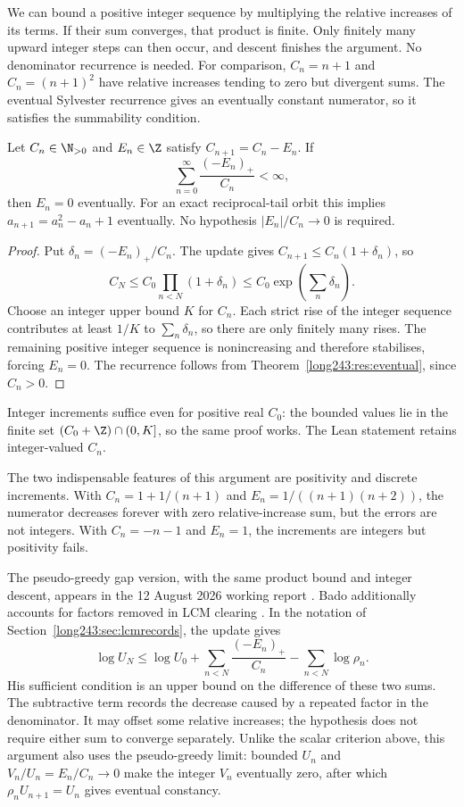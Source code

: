 We can bound a positive integer sequence by multiplying the relative
increases of its terms. If their sum converges, that product is finite.
Only finitely many upward integer steps can then occur, and descent
finishes the argument. No denominator recurrence is needed.
For comparison, $C_n=n+1$ and $C_n=(n+1)^2$ have relative increases
tending to zero but divergent sums. The eventual Sylvester recurrence gives an eventually
constant numerator, so it satisfies the summability condition.

\begin{samepage}
\begin{theorem}\label{long243:res:mass}
Let \(C_n\in\N_{>0}\) and \(E_n\in\Z\) satisfy \(C_{n+1}=C_n-E_n\).
If
\[
 \sum_{n=0}^{\infty}\frac{(-E_n)_+}{C_n}<\infty,
\]
then \(E_n=0\) eventually. For an exact reciprocal-tail orbit this implies
\(a_{n+1}=a_n^2-a_n+1\) eventually. No hypothesis $|E_n|/C_n\to0$ is required.
\end{theorem}
\end{samepage}

\begin{proof}
Put \(\delta_n=(-E_n)_+/C_n\). The update gives
\(C_{n+1}\le C_n(1+\delta_n)\), so
\[
 C_N\le C_0\prod_{n<N}(1+\delta_n)
 \le C_0\exp\!\left(\sum_n\delta_n\right).
\]
Choose an integer upper bound \(K\) for \(C_n\). Each strict rise of the
integer sequence contributes at least \(1/K\) to \(\sum_n\delta_n\), so
there are only finitely many rises. The remaining positive integer sequence
is nonincreasing and therefore stabilises, forcing \(E_n=0\). The recurrence
follows from Theorem~\ref{long243:res:eventual}, since \(C_n>0\).
\end{proof}

Integer increments suffice even for positive real $C_0$: the bounded
values lie in the finite set $(C_0+\Z)\cap(0,K]$, so the same proof
works. The Lean statement retains integer-valued $C_n$.

The two indispensable features of this argument are positivity and
discrete increments. With $C_n=1+1/(n+1)$ and
$E_n=1/((n+1)(n+2))$, the numerator decreases forever with zero
relative-increase sum, but the errors are not integers. With $C_n=-n-1$
and $E_n=1$, the increments are integers but positivity fails.

The pseudo-greedy gap version, with the same product bound and integer
descent, appears in the 12 August 2026 working report
\cite[``A global termination criterion'']{erdosproblemaday243}.
Bado additionally accounts for factors removed in LCM clearing
\cite[Thm.~11.1 and Remark~11.3, p.~9]{bado2026}. In the notation of
Section~\ref{long243:sec:lcmrecords}, the update gives
\[
 \log U_N\le\log U_0+
 \sum_{n<N}\frac{(-E_n)_+}{C_n}-\sum_{n<N}\log\rho_n.
\]
His sufficient condition is an upper bound on the difference of these
two sums. The subtractive term records the decrease caused by a repeated
factor in the denominator. It may offset some relative increases; the
hypothesis does not require either sum to converge separately. Unlike the
scalar criterion above, this argument also uses the pseudo-greedy limit:
bounded $U_n$ and $V_n/U_n=E_n/C_n\to0$ make the integer $V_n$ eventually
zero, after which $\rho_nU_{n+1}=U_n$ gives eventual constancy.

